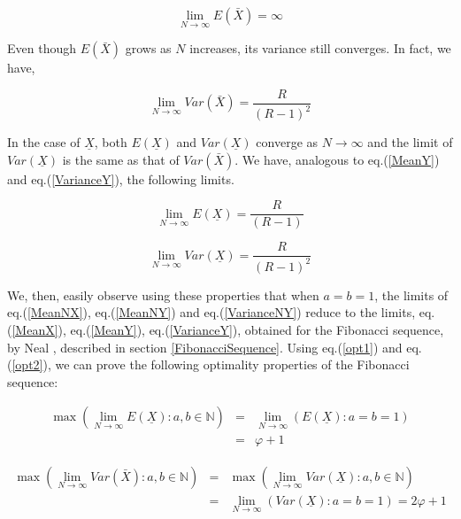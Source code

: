 \begin{multicols}{2}
\begin{thm}
 \label{thm-1}
\begin{equation*}
\lim_{N \rightarrow \infty} E(\bar{X}) = \infty
\end{equation*}
\end{thm}
Even though $E(\bar{X})$ grows as $N$ increases, its variance still converges. In fact, we have,\\ 
 \begin{thm}
 \label{thm-2}
\begin{equation*}
\lim_{N \rightarrow \infty} Var(\bar{X}) = \frac{R}{(R-1)^2}
\end{equation*}
 \end{thm}
In the case of $\underline{X} $, both $E(\underline{X})$ and $Var(\underline{X})$ converge as $N \rightarrow \infty$ and the limit of $Var(\underline{X})$ is the same as that of $Var(\bar{X})$. We have, analogous to eq.(\ref{MeanY}) and eq.(\ref{VarianceY}), the following limits.
\begin{thm}
 \label{thm-3}
\begin{equation}\nonumber
\lim_{N \rightarrow \infty} E(\underline{X}) = \frac{R}{(R-1)}
\end{equation}
 \end{thm}
 \begin{thm}
 \label{thm-4}
\begin{equation}\nonumber
\lim_{N \rightarrow \infty} Var(\underline{X}) = \frac{R}{(R-1)^2}
\end{equation}
 \end{thm}
We, then, easily observe using these properties that when $a = b = 1$, the limits of eq.(\ref{MeanNX}), eq.(\ref{MeanNY}) and eq.(\ref{VarianceNY}) reduce to the limits, eq.(\ref{MeanX}), eq.(\ref{MeanY}), eq.(\ref{VarianceY}), obtained for the Fibonacci sequence, by Neal \cite{art2-key01}, described in section \ref{FibonacciSequence}. Using eq.(\ref{opt1}) and eq.(\ref{opt2}), we can prove the following optimality properties of the Fibonacci sequence:
\begin{thm}
 \label{thm-5}
\begin{eqnarray*}
\label{MeanMax}
\max{\left(\lim_{N\rightarrow \infty} E(\underline{X}): a, b \in \mathbb N \right)} &=& \lim_{N \rightarrow \infty}\left(E(\underline{X}):a=b=1\right)\\
 &=& \varphi + 1
\end{eqnarray*}
\end{thm}
\begin{thm}
\label{thm-6}
{\fontsize{7.4}{8.4}\selectfont\begin{eqnarray*}
\label{VarianceMax}
\max{\left (\lim_{N\rightarrow \infty}Var(\bar{X}): a,b \in \mathbb N\right)} &=&\max{\left(\lim_{N\rightarrow \infty}Var(\underline{X}): a,b \in \mathbb N\right)}\\
&=& \lim_{N \rightarrow \infty}\left(Var(\underline{X}):a=b=1\right)= 2\varphi + 1
\end{eqnarray*}}


\end{thm}
\end{multicols}
